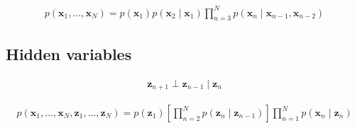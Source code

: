 \documentclass{article}
\begin{document}
\begin{align*}
p\left(\mathbf{x}_{1}, \ldots, \mathbf{x}_{N}\right)=p\left(\mathbf{x}_{1}\right) p\left(\mathbf{x}_{2} \mid \mathbf{x}_{1}\right) \prod_{n=3}^{N} p\left(\mathbf{x}_{n} \mid \mathbf{x}_{n-1}, \mathbf{x}_{n-2}\right) 
\tag{11.46}
\end{align*}

\subsection{Hidden variables}

\begin{align*}
\mathbf{z}_{n+1} \perp \mathbf{z}_{n-1} \mid \mathbf{z}_{n} 
\tag{11.47}
\end{align*}

\begin{align*}
p\left(\mathbf{x}_{1}, \ldots, \mathbf{x}_{N}, \mathbf{z}_{1}, \ldots, \mathbf{z}_{N}\right)=p\left(\mathbf{z}_{1}\right)\left[
\prod_{n=2}^{N} p\left(\mathbf{z}_{n} \mid \mathbf{z}_{n-1}\right)\right]
\prod_{n=1}^{N} p\left(\mathbf{x}_{n} \mid \mathbf{z}_{n}\right) 
\tag{11.48}
\end{align*}
\end{document}
